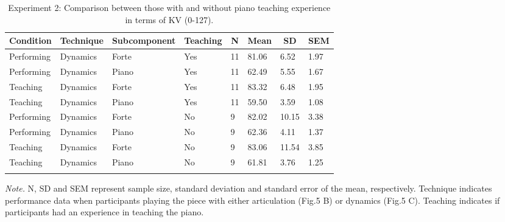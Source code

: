 \documentclass[
  man,floatsintext]{apa6}
\begin{document}
\begin{table}[tbp]

\begin{center}
\begin{threeparttable}

\caption{\label{tab:dyn-teaching-desc-2}Experiment 2: Comparison between those with and without piano teaching experience in terms of KV (0-127).}

\begin{tabular}{llllllll}
\toprule
Condition & \multicolumn{1}{c}{Technique} & \multicolumn{1}{c}{Subcomponent} & \multicolumn{1}{c}{Teaching} & \multicolumn{1}{c}{N} & \multicolumn{1}{c}{Mean} & \multicolumn{1}{c}{SD} & \multicolumn{1}{c}{SEM}\\
\midrule
Performing & Dynamics & Forte & Yes & 11 & 81.06 & 6.52 & 1.97\\
Performing & Dynamics & Piano & Yes & 11 & 62.49 & 5.55 & 1.67\\
Teaching & Dynamics & Forte & Yes & 11 & 83.32 & 6.48 & 1.95\\
Teaching & Dynamics & Piano & Yes & 11 & 59.50 & 3.59 & 1.08\\
Performing & Dynamics & Forte & No & 9 & 82.02 & 10.15 & 3.38\\
Performing & Dynamics & Piano & No & 9 & 62.36 & 4.11 & 1.37\\
Teaching & Dynamics & Forte & No & 9 & 83.06 & 11.54 & 3.85\\
Teaching & Dynamics & Piano & No & 9 & 61.81 & 3.76 & 1.25\\
\bottomrule
\addlinespace
\end{tabular}

\begin{tablenotes}[para]
\normalsize{\textit{Note.} N, SD and SEM represent sample size, standard deviation and standard error of the mean, respectively. Technique indicates performance data when participants playing the piece with either articulation (Fig.5 B) or dynamics (Fig.5 C). Teaching indicates if participants had an experience in teaching the piano.}
\end{tablenotes}

\end{threeparttable}
\end{center}

\end{table}
\end{document}
